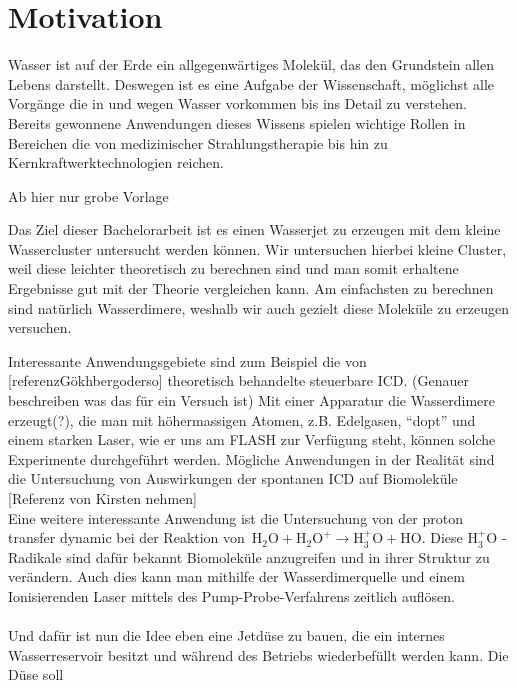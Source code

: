 
  \chapter{Motivation} 
  
  Wasser ist auf der Erde ein allgegenwärtiges Molekül, das den Grundstein allen Lebens darstellt. Deswegen ist es eine Aufgabe der Wissenschaft, möglichst alle Vorgänge die in und wegen Wasser vorkommen bis ins Detail zu verstehen. Bereits gewonnene Anwendungen dieses Wissens spielen wichtige Rollen in Bereichen die von  medizinischer Strahlungstherapie bis hin zu Kernkraftwerktechnologien reichen. 
  
 Ab hier nur grobe Vorlage
  
  Das Ziel dieser Bachelorarbeit ist es einen Wasserjet zu erzeugen mit dem kleine Wassercluster untersucht werden können. Wir untersuchen hierbei kleine Cluster, weil diese leichter theoretisch zu berechnen sind und man somit erhaltene Ergebnisse gut mit der Theorie vergleichen kann. Am einfachsten zu berechnen sind natürlich Wasserdimere, weshalb wir auch gezielt diese Moleküle zu erzeugen versuchen.
  
  Interessante Anwendungsgebiete sind zum Beispiel die von [referenzGökhbergoderso] theoretisch behandelte steuerbare ICD. (Genauer beschreiben was das für ein Versuch ist) Mit einer Apparatur die Wasserdimere erzeugt(?), die man mit höhermassigen Atomen, z.B. Edelgasen, \enquote{dopt} und einem starken Laser, wie er uns am FLASH zur Verfügung steht, können solche Experimente durchgeführt werden. Mögliche Anwendungen in der Realität sind die Untersuchung von Auswirkungen der spontanen ICD auf Biomoleküle [Referenz von Kirsten nehmen]\\
  Eine weitere interessante Anwendung ist die Untersuchung von der proton transfer dynamic bei der Reaktion von\  $\mathrm{H}_2\mathrm{O} +  \mathrm{H}_2\mathrm{O}^{+} \rightarrow  \mathrm{H}_3^{+}\mathrm{O} + \mathrm{H}\mathrm{O}$. Diese $\mathrm{H}_3^{+}\mathrm{O}$ - Radikale sind dafür bekannt Biomoleküle anzugreifen und in ihrer Struktur zu verändern. Auch dies kann man mithilfe der Wasserdimerquelle und einem Ionisierenden Laser mittels des Pump-Probe-Verfahrens zeitlich auflösen.\\
  \\
 Und dafür ist nun die Idee eben eine Jetdüse zu bauen, die ein internes Wasserreservoir besitzt und während des Betriebs wiederbefüllt werden kann. Die Düse soll 
 
